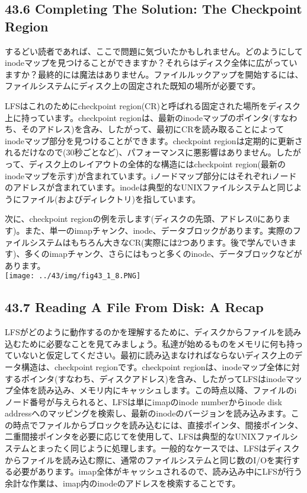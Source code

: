 \hypertarget{completing-the-solution-the-checkpoint-region}{%
\subsection*{43.6 Completing The Solution: The Checkpoint
Region}\label{completing-the-solution-the-checkpoint-region}}

するどい読者であれば、ここで問題に気づいたかもしれません。どのようにしてinodeマップを見つけることができますか？それらはディスク全体に広がっていますか？最終的には魔法はありません。ファイルルックアップを開始するには、ファイルシステムにディスク上の固定された既知の場所が必要です。

LFSはこれのためにcheckpoint
region(CR)と呼ばれる固定された場所をディスク上に持っています。checkpoint
regionは、最新のinodeマップのポインタ(すなわち、そのアドレス)を含み、したがって、最初にCRを読み取ることによってinodeマップ部分を見つけることができます。checkpoint
regionは定期的に更新されるだけなので(30秒ごとなど)、パフォーマンスに悪影響はありません。したがって、ディスク上のレイアウトの全体的な構造にはcheckpoint
region(最新のinodeマップを示す)が含まれています。iノードマップ部分にはそれぞれiノードのアドレスが含まれています。inodeは典型的なUNIXファイルシステムと同じようにファイル(およびディレクトリ)を指しています。

次に、checkpoint
regionの例を示します(ディスクの先頭、アドレス0にあります)。また、単一のimapチャンク、inode、データブロックがあります。実際のファイルシステムはもちろん大きなCR(実際には2つあります。後で学んでいきます)、多くのimapチャンク、さらにはもっと多くのinode、データブロックなどがあります。\\
\texttt{[image: ../43/img/fig43\_1\_8.PNG]}

\hypertarget{reading-a-file-from-disk-a-recap}{%
\subsection*{43.7 Reading A File From Disk: A
Recap}\label{reading-a-file-from-disk-a-recap}}

LFSがどのように動作するのかを理解するために、ディスクからファイルを読み込むために必要なことを見てみましょう。私達が始めるものをメモリに何も持っていないと仮定してください。最初に読み込まなければならないディスク上のデータ構造は、checkpoint
regionです。checkpoint
regionは、inodeマップ全体に対するポインタ(すなわち、ディスクアドレス)を含み、したがってLFSはinodeマップ全体を読み込み、メモリ内にキャッシュします。この時点以降、ファイルのiノード番号が与えられると、LFSは単にimapのinode
numberからinode disk
addressへのマッピングを検索し、最新のinodeのバージョンを読み込みます。この時点でファイルからブロックを読み込むには、直接ポインタ、間接ポインタ、二重間接ポインタを必要に応じてを使用して、LFSは典型的なUNIXファイルシステムとまったく同じように処理します。一般的なケースでは、LFSはディスクからファイルを読み込む際に、通常のファイルシステムと同じ数のI/Oを実行する必要があります。imap全体がキャッシュされるので、読み込み中にLFSが行う余計な作業は、imap内のinodeのアドレスを検索することです。

